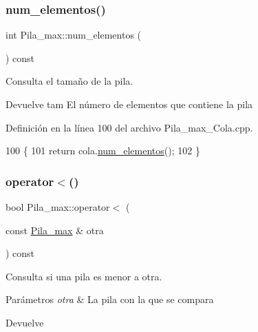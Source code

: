 \subsubsection{\texorpdfstring{num\+\_\+elementos()}{num\_elementos()}\hspace{0.1cm}{\footnotesize\ttfamily [2/2]}}
{\footnotesize\ttfamily int Pila\+\_\+max\+::num\+\_\+elementos (\begin{DoxyParamCaption}{ }\end{DoxyParamCaption}) const}



Consulta el tamaño de la pila. 

\begin{DoxyReturn}{Devuelve}
tam El número de elementos que contiene la pila 
\end{DoxyReturn}


Definición en la línea 100 del archivo Pila\+\_\+max\+\_\+\+Cola.\+cpp.


\begin{DoxyCode}
100                                  \{
101     \textcolor{keywordflow}{return} cola.\hyperlink{classCola_a26e5b0df5411aa23114d790f0a8c023b}{num\_elementos}();
102 \}
\end{DoxyCode}
\mbox{\label{classPila__max_a95b52785eaa96cebe08b6b000953c1ac}} 
\subsubsection{\texorpdfstring{operator$<$()}{operator<()}\hspace{0.1cm}{\footnotesize\ttfamily [1/2]}}
{\footnotesize\ttfamily bool Pila\+\_\+max\+::operator$<$ (\begin{DoxyParamCaption}\item[{const \hyperlink{classPila__max}{Pila\+\_\+max} \&}]{otra }\end{DoxyParamCaption}) const}



Consulta si una pila es menor a otra. 


\begin{DoxyParams}{Parámetros}
{\em otra} & La pila con la que se compara \\
\hline
\end{DoxyParams}
\begin{DoxyReturn}{Devuelve}

\end{DoxyReturn}

